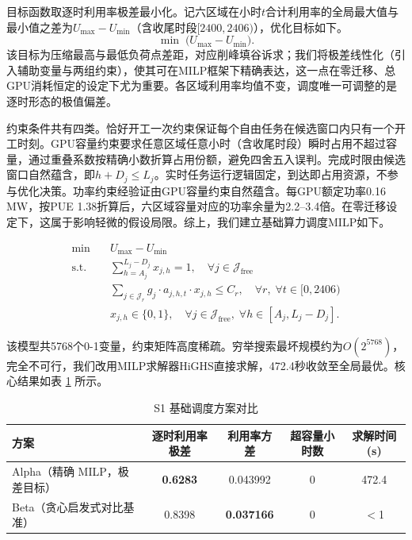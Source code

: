 目标函数取逐时利用率极差最小化。记六区域在小时$t$合计利用率的全局最大值与最小值之差为$U_{\max}-U_{\min}$（含收尾时段$[2400,2406)$），优化目标如下。
\begin{equation}
\min\; \bigl(U_{\max} - U_{\min}\bigr).
\end{equation}
该目标为压缩最高与最低负荷点差距，对应削峰填谷诉求；我们将极差线性化（引入辅助变量与两组约束），使其可在MILP框架下精确表达，这一点在零迁移、总GPU消耗恒定的设定下尤为重要。各区域利用率均值不变，调度唯一可调整的是逐时形态的极值偏差。

约束条件共有四类。恰好开工一次约束保证每个自由任务在候选窗口内只有一个开工时刻。GPU容量约束要求任意区域任意小时（含收尾时段）瞬时占用不超过容量，通过重叠系数按精确小数折算占用份额，避免四舍五入误判。完成时限由候选窗口自然蕴含，即$h+D_j\le L_j$。实时任务运行逻辑固定，到达即占用资源，不参与优化决策。功率约束经验证由GPU容量约束自然蕴含。每GPU额定功率0.16 MW，按PUE 1.38折算后，六区域容量对应的功率余量为2.2--3.4倍。在零迁移设定下，这属于影响轻微的假设局限。综上，我们建立基础算力调度MILP如下。

\begin{equation}
\begin{aligned}
\min \quad & U_{\max} - U_{\min} \\
\text{s.t.} \quad & \sum_{h=A_j}^{L_j-D_j} x_{j,h} = 1, \quad \forall j\in\mathcal{J}_{\text{free}} \\
& \sum_{j\in\mathcal{J}_r} g_j\cdot a_{j,h,t}\cdot x_{j,h} \le C_r, \quad \forall r,\;\forall t\in[0,2406) \\
& x_{j,h}\in\{0,1\},\quad \forall j\in\mathcal{J}_{\text{free}},\;\forall h\in[A_j,L_j-D_j].
\end{aligned}
\end{equation}

该模型共5768个0-1变量，约束矩阵高度稀疏。穷举搜索最坏规模约为$O(2^{5768})$，完全不可行，我们改用MILP求解器HiGHS直接求解，472.4秒收敛至全局最优。核心结果如表 \ref{tab:s1-head2head} 所示。

\begin{table}[htbp]
\centering
\caption{S1 基础调度方案对比}
\label{tab:s1-head2head}
\begin{tabular}{lcccc}
\toprule
方案 & 逐时利用率极差 & 利用率方差 & 超容量小时数 & 求解时间 (s) \\
\midrule
Alpha（精确 MILP，极差目标） & \textbf{0.6283} & 0.043992 & 0 & 472.4 \\
Beta（贪心启发式对比基准） & 0.8398 & \textbf{0.037166} & 0 & $<$1 \\
\bottomrule
\end{tabular}
\end{table}

